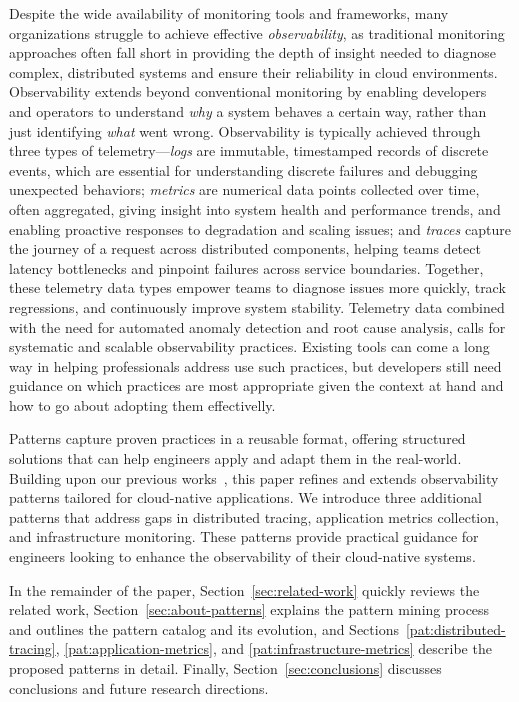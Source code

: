 \documentclass[runningheads]{llncs}
\begin{document}
Despite the wide availability of monitoring tools and frameworks, many organizations struggle to achieve effective \textit{observability}, as traditional monitoring approaches often fall short in providing the depth of insight needed to diagnose complex, distributed systems and ensure their reliability in cloud environments. Observability extends beyond conventional monitoring by enabling developers and operators to understand \textit{why} a system behaves a certain way, rather than just identifying \textit{what} went wrong. Observability is typically achieved through three types of telemetry---\textit{logs} are immutable, timestamped records of discrete events, which are essential for understanding discrete failures and debugging unexpected behaviors; \textit{metrics} are numerical data points collected over time, often aggregated, giving insight into system health and performance trends, and enabling proactive responses to degradation and scaling issues; and \textit{traces} capture the journey of a request across distributed components, helping teams detect latency bottlenecks and pinpoint failures across service boundaries. Together, these telemetry data types empower teams to diagnose issues more quickly, track regressions, and continuously improve system stability. Telemetry data combined with the need for automated anomaly detection and root cause analysis, calls for systematic and scalable observability practices. Existing tools can come a long way in helping professionals address use such practices, but developers still need guidance on which practices are most appropriate given the context at hand and how to go about adopting them effectivelly. 

Patterns capture proven practices in a reusable format, offering structured solutions that can help engineers apply and adapt them in the real-world. Building upon our previous works~\cite{Albuquerque-2022,Albuquerque-2023,Albuquerque-2024}, this paper refines and extends observability patterns tailored for cloud-native applications. We introduce three additional patterns that address gaps in distributed tracing, application metrics collection, and infrastructure monitoring. These patterns provide practical guidance for engineers looking to enhance the observability of their cloud-native systems.

In the remainder of the paper, Section~\ref{sec:related-work} quickly reviews the related work, Section~\ref{sec:about-patterns} explains the pattern mining process and outlines the pattern catalog and its evolution, and Sections~\ref{pat:distributed-tracing}, \ref{pat:application-metrics}, and \ref{pat:infrastructure-metrics} describe the proposed patterns in detail. Finally, Section~\ref{sec:conclusions} discusses conclusions and future research directions.
\end{document}
